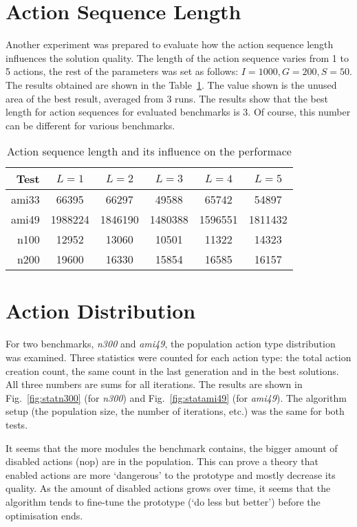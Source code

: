 \section{Action Sequence Length}

Another experiment was prepared to evaluate how the action sequence length influences the solution quality. The length of the action sequence varies from 1 to 5 actions, the rest of the parameters was set as follows: $ I=1000, G=200, S=50 $. The results obtained are shown in the Table~\ref{tab:length}. The value shown is the unused area of the best result, averaged from 3 runs. The results show that the best length for action sequences for evaluated benchmarks is 3. Of course, this number can be different for various benchmarks.

\begin{table}
\centering
\begin{tabular}{|r|c|c|c|c|c|}
\hline
Test & $L=1$ & $L=2$ & $L=3$ & $L=4$ & $L=5$ \\
\hline
\hline
ami33 & 66395 & 66297 & 49588 & 65742 & 54897 \\
\hline
ami49 & 1988224 & 1846190 & 1480388 & 1596551 & 1811432 \\
\hline
n100 & 12952 & 13060 & 10501 & 11322 & 14323 \\
\hline
n200 & 19600 & 16330 & 15854 & 16585 & 16157 \\
\hline
\end{tabular}
\caption{Action sequence length and its influence on the performace}
\label{tab:length}
\end{table}

\section{Action Distribution}

For two benchmarks, {\em n300} and {\em ami49}, the population action type distribution was examined. Three statistics were counted for each action type: the total action creation count, the same count in the last generation and in the best solutions. All three numbers are sums for all iterations. The results are shown in Fig.~\ref{fig:statn300} (for {\em n300}) and Fig.~\ref{fig:statami49} (for {\em ami49}). The algorithm setup (the population size, the number of iterations, etc.) was the same for both tests.

It seems that the more modules the benchmark contains, the bigger amount of disabled actions (nop) are in the population. This can prove a theory that enabled actions are more `dangerous' to the prototype and mostly decrease its quality. As the amount of disabled actions grows over time, it seems that the algorithm tends to  fine-tune the prototype (`do less but better') before the optimisation ends.

